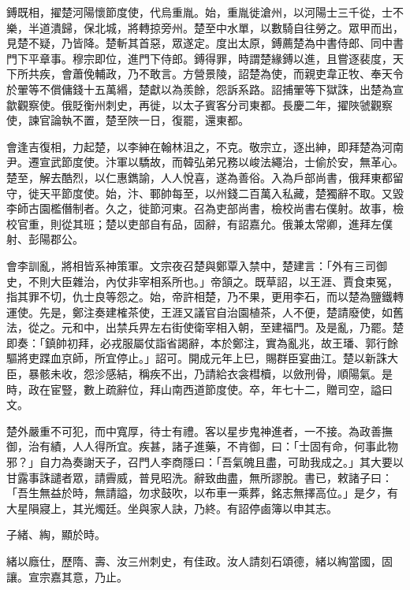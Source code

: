 \begin{pinyinscope}
 鎛既相，擢楚河陽懷節度使，代烏重胤。始，重胤徙滄州，以河陽士三千從，士不樂，半道潰歸，保北城，將轉掠旁州。楚至中水單，以數騎自往勞之。眾甲而出，見楚不疑，乃皆降。楚斬其首惡，眾遂定。度出太原，鎛薦楚為中書侍郎、同中書門下平章事。穆宗即位，進門下侍郎。鎛得罪，時謂楚緣鎛以進，且嘗逐裴度，天下所共疾，會蕭俛輔政，乃不敢言。方營景陵，詔楚為使，而親吏韋正牧、奉天令於翬等不償傭錢十五萬緡，楚獻以為羨餘，怨訴系路。詔捕翬等下獄誅，出楚為宣歙觀察使。俄貶衡州刺史，再徙，以太子賓客分司東都。長慶二年，擢陜虢觀察使，諫官論執不置，楚至陜一日，復罷，還東都。



 會逢吉復相，力起楚，以李紳在翰林沮之，不克。敬宗立，逐出紳，即拜楚為河南尹。遷宣武節度使。汴軍以驕故，而韓弘弟兄務以峻法繩治，士偷於安，無革心。楚至，解去酷烈，以仁惠鐫諭，人人悅喜，遂為善俗。入為戶部尚書，俄拜東都留守，徙天平節度使。始，汴、鄆帥每至，以州錢二百萬入私藏，楚獨辭不取。又毀李師古園檻僭制者。久之，徙節河東。召為吏部尚書，檢校尚書右僕射。故事，檢校官重，則從其班；楚以吏部自有品，固辭，有詔嘉允。俄兼太常卿，進拜左僕射、彭陽郡公。



 會李訓亂，將相皆系神策軍。文宗夜召楚與鄭覃入禁中，楚建言：「外有三司御史，不則大臣雜治，內仗非宰相系所也。」帝頷之。既草詔，以王涯、賈食束冤，指其罪不切，仇士良等怨之。始，帝許相楚，乃不果，更用李石，而以楚為鹽鐵轉運使。先是，鄭注奏建榷茶使，王涯又議官自治園植茶，人不便，楚請廢使，如舊法，從之。元和中，出禁兵畀左右街使衛宰相入朝，至建福門。及是亂，乃罷。楚即奏：「鎮帥初拜，必戎服屬仗詣省謁辭，本於鄭注，實為亂兆，故王璠、郭行餘驅將吏蹀血京師，所宜停止。」詔可。開成元年上巳，賜群臣宴曲江。楚以新誅大臣，暴骸未收，怨沴感結，稱疾不出，乃請給衣衾槥櫝，以斂刑骨，順陽氣。是時，政在宦豎，數上疏辭位，拜山南西道節度使。卒，年七十二，贈司空，謚曰文。



 楚外嚴重不可犯，而中寬厚，待士有禮。客以星步鬼神進者，一不接。為政善撫御，治有績，人人得所宜。疾甚，諸子進藥，不肯御，曰：「士固有命，何事此物邪？」自力為奏謝天子，召門人李商隱曰：「吾氣魄且盡，可助我成之。」其大要以甘露事誅譴者眾，請霽威，普見昭洗。辭致曲盡，無所謬脫。書已，敕諸子曰：「吾生無益於時，無請謚，勿求鼓吹，以布車一乘葬，銘志無擇高位。」是夕，有大星隕寢上，其光燭廷。坐與家人訣，乃終。有詔停鹵簿以申其志。



 子緒、綯，顯於時。



 緒以廕仕，歷隋、壽、汝三州刺史，有佳政。汝人請刻石頌德，緒以綯當國，固讓。宣宗嘉其意，乃止。




\end{pinyinscope}
